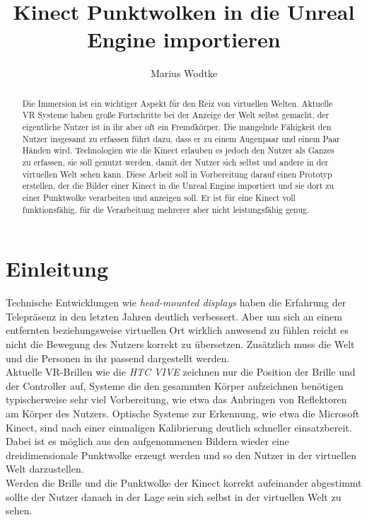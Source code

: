 \documentclass[a4paper]{IEEEtran}
\title{Kinect Punktwolken in die Unreal Engine importieren}
\author{Marius Wodtke}
\begin{document}
\maketitle

\begin{abstract}
	Die Immersion ist ein wichtiger Aspekt für den Reiz von virtuellen Welten. 
	Aktuelle VR Systeme haben große Fortschritte bei der Anzeige der Welt selbst gemacht, der eigentliche Nutzer ist in ihr aber oft ein Fremdkörper.
	Die mangelnde Fähigkeit den Nutzer insgesamt zu erfassen führt dazu, dass er zu einem Augenpaar und einem Paar Händen wird. 
	Technologien wie die Kinect erlauben es jedoch den Nutzer als Ganzes zu erfassen, sie soll genutzt werden, damit der Nutzer sich selbst und andere in der virtuellen Welt sehen kann.
	Diese Arbeit soll in Vorbereitung darauf einen Prototyp erstellen, der die Bilder einer Kinect in die Unreal Engine importiert und sie dort zu einer Punktwolke verarbeiten und anzeigen soll.
	Er ist für eine Kinect voll funktionsfähig, für die Verarbeitung mehrerer aber nicht leistungsfähig genug.
\end{abstract}

\section{Einleitung}
	Technische Entwicklungen wie {\textit{head-mounted displays}} haben die Erfahrung der Telepräsenz in den letzten Jahren deutlich verbessert. 
	Aber um sich an einem entfernten beziehungsweise virtuellen Ort wirklich anwesend zu fühlen reicht es nicht die Bewegung des Nutzers korrekt zu übersetzen. 
	Zusätzlich muss die Welt und die Personen in ihr passend dargestellt werden. \\
	Aktuelle VR-Brillen wie die \textit{HTC VIVE} zeichnen nur die Position der Brille und der Controller auf, Systeme die den gesammten Körper aufzeichnen benötigen typischerweise sehr viel Vorbereitung, wie etwa das Anbringen von Reflektoren am Körper des Nutzers. 
	Optische Systeme zur Erkennung, wie etwa die Microsoft Kinect, sind nach einer einmaligen Kalibrierung deutlich schneller einsatzbereit. 
	Dabei ist es möglich aus den aufgenommenen Bildern wieder eine dreidimensionale Punktwolke erzeugt werden und so den Nutzer in der virtuellen Welt darzustellen. \\
	Werden die Brille und die Punktwolke der Kinect korrekt aufeinander abgestimmt sollte der Nutzer danach in der Lage sein sich selbst in der virtuellen Welt zu sehen.\\
	
\end{document}
